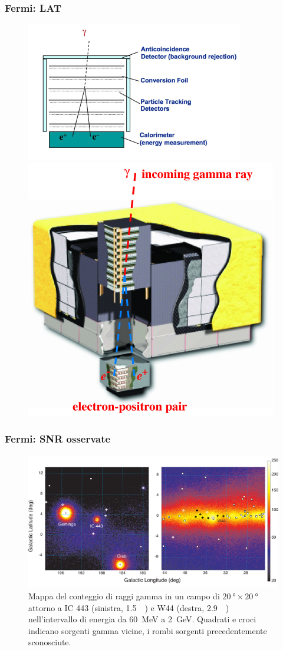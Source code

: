 \documentclass[10pt]{beamer}
\begin{document}
\begin{frame}
  \frametitle{Fermi: LAT}
  \begin{figure}
    \centering
    \includegraphics[width=0.6\columnwidth]{Gamma_telescope_schematic}
    \includegraphics[width=0.4\columnwidth]{f1}
  \end{figure}
\end{frame}

\begin{frame}
  \frametitle{Fermi: SNR osservate}
  \begin{figure}
    \centering
    \includegraphics[width=0.8\columnwidth]{1231160fig1.pdf}
    \caption{Mappa del conteggio di raggi gamma in un campo di
      $\SI{20}{\degree} \times \SI{20}{\degree}$ attorno a IC 443 (sinistra,
      \SI{1.5}{\kilo \parsec}) e W44 (destra, \SI{2.9}{\kilo \parsec})
      nell'intervallo di energia da \SI{60}{\mega\electronvolt} a
      \SI{2}{\giga\electronvolt}.  Quadrati e croci indicano sorgenti gamma
      vicine, i rombi sorgenti precedentemente sconosciute.}
  \end{figure}
\end{frame}
\end{document}
